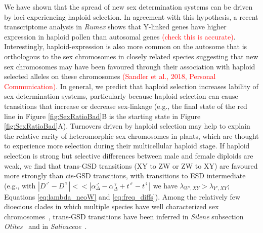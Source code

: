 \documentclass[10pt,letterpaper]{article}
\begin{document}
We have shown that the spread of new sex determination systems can be driven by loci experiencing haploid selection. 
In agreement with this hypothesis, a recent transcriptome analysis in \textit{Rumex} shows that Y-linked genes have higher expression in haploid pollen than autosomal genes \textcolor{red}{(check this is accurate)}.
Interestingly, haploid-expression is also more common on the autosome that is orthologous to the sex chromosomes in closely related species suggesting that new sex chromosomes may have been favoured through their association with haploid selected alleles on these chromosomes \textcolor{red}{(Sandler et al., 2018, Personal Communication)}.
In general, we predict that haploid selection increases lability of sex-determination systems, particularly because haploid selection can cause transitions that increase or decrease sex-linkage (e.g., the final state of the red line in Figure \ref{fig:SexRatioBad}B is the starting state in Figure \ref{fig:SexRatioBad}A). 
Turnovers driven by haploid selection may help to explain the relative rarity of heteromorphic sex chromosomes in plants, which are thought to experience more selection during their multicellular haploid stage.
If haploid selection is strong but selective differences between male and female diploids are weak, we find that trans-GSD transitions (XY to ZW or ZW to XY) are favoured more strongly than cis-GSD transitions, with transitions to ESD intermediate (e.g., with $|D^\male - D^\female| << |\alpha_\Delta^\male - \alpha_\Delta^\female + t^\male - t^\female|$ we have $\lambda_{W',XY} > \lambda_{Y',XY}$; Equations \ref{eq:lambda_neoW} and \ref{eq:freq_diffs}). 
Among the relatively few dioecious clades in which multiple species have well characterized sex chromosomes~\cite{Ming:2011iy}, trans-GSD transitions have been inferred in \textit{Silene} subsection \textit{Otites}~\cite{Slancarova:2013dq} and in \textit{Salicaceae}~\cite{Pucholt2015,Pucholt2017}.
\end{document}
